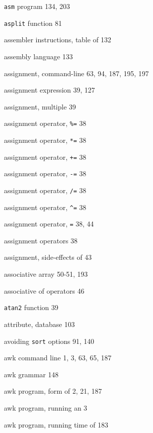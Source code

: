 \begin{multicols}{3}
\hangindent=4pc  \verb'asm' program 134, 203

\hangindent=4pc  \verb'asplit' function 81

\hangindent=4pc  assembler instructions, table of 132

\hangindent=4pc  assembly language 133

\hangindent=4pc  assignment, command-line 63, 94, 187, 195, 197

\hangindent=4pc  assignment expression 39, 127

\hangindent=4pc  assignment, multiple 39

\hangindent=4pc  assignment operator, \verb'%=' 38

\hangindent=4pc  assignment operator, \verb'*=' 38

\hangindent=4pc  assignment operator, \verb'+=' 38

\hangindent=4pc  assignment operator, \verb'-=' 38

\hangindent=4pc  assignment operator, \verb'/=' 38

\hangindent=4pc  assignment operator, \verb'^=' 38

\hangindent=4pc  assignment operator, \verb'=' 38, 44

\hangindent=4pc  assignment operators 38

\hangindent=4pc  assignment, side-effects of 43

\hangindent=4pc  associative array 50-51, 193

\hangindent=4pc  associative of operators 46

\hangindent=4pc  \verb'atan2' function 39

\hangindent=4pc  attribute, database 103

\hangindent=4pc  avoiding \verb'sort' options 91, 140

\hangindent=4pc  awk command line 1, 3, 63, 65, 187

\hangindent=4pc  awk grammar 148

\hangindent=4pc  awk program, form of 2, 21, 187

\hangindent=4pc  awk program, running an 3

\hangindent=4pc  awk program, running time of 183


\end{multicols}
